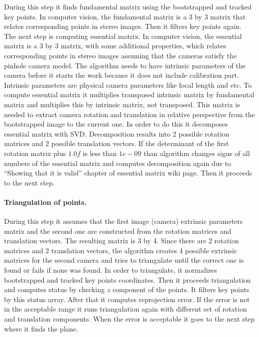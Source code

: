 \documentclass[../../main]{subfiles}
\begin{document}
During this step it finds fundamental matrix using the bootstrapped and tracked key points. In computer vision, the fundamental matrix is a 3 by 3 matrix that relates corresponding points in stereo images. Then it filters key points again. The next step is computing essential matrix. In computer vision, the essential matrix is a 3 by 3 matrix, with some additional properties, which relates corresponding points in stereo images assuming that the cameras satisfy the pinhole camera model. The algorithm needs to have intrinsic parameters of the camera before it starts the work because it does not include calibration part. Intrinsic parameters are physical camera parameters like focal length and etc. To compute essential matrix it multiplies transposed intrinsic matrix by fundamental matrix and multiplies this by intrinsic matrix, not transposed. This matrix is needed to extract camera rotation and translation in relative perspective from the bootstrapped image to the current one. In order to do this it decomposes essential matrix with \ac{SVD}. Decomposition results into 2 possible rotation matrices and 2 possible translation vectors. If the determinant of the first rotation matrix plus $1.0f$ is less than $1e-09$ than algorithm changes signs of all numbers of the essential matrix and computes decomposition again due to “Showing that it is valid” chapter of essential matrix wiki page. Then it proceeds to the next step.

\paragraph*{Triangulation of points.}

During this step it assumes that the first image (camera) extrinsic parameters matrix and the second one are constructed from the rotation matrices and translation vectors. The resulting matrix is 3 by 4. Since there are 2 rotation matrices and 2 translation vectors, the algorithm creates 4 possible extrinsic matrices for the second camera and tries to triangulate until the correct one is found or fails if none was found. In order to triangulate, it normalizes bootstrapped and tracked key points coordinates. Then it proceeds triangulation and computes status by checking $z$ component of the points. It filters key points by this status array. After that it computes reprojection error. If the error is not in the acceptable range it runs triangulation again with different set of rotation and translation components. When the error is acceptable it goes to the next step where it finds the plane.
\end{document}
